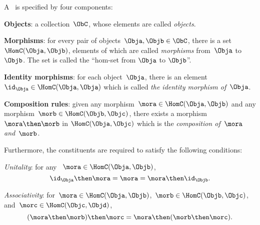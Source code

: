 \begin{ctdefinition}[Category]
    \label{def:categorymain}
    A \emph{}~\CatC is specified by four components:
    \begin{compactenum}
        \item \textbf{Objects}: a collection\footnotemark~$\ObC$, whose elements are called \emph{objects}.
        \item \textbf{Morphisms}: for every pair of objects~$\Obja,\Objb\in \ObC$, there is a set~${ \HomC}({\Obja,\Objb})$, elements of which are called
        \emph{morphisms} from~$\Obja$ to~$ \Objb$. The set is called the ``hom-set from $\Obja$ to $\Objb$''.
        \item \textbf{Identity morphisms}: for each object~$ \Obja$, there is
        an element~$\id_{\Obja} \in \HomC({\Obja,\Obja}) $ which is called \emph{the identity
        morphism of~$\Obja$}.
        \item \textbf{Composition rules}: given any morphism~$ { \mora} \in  \HomC(\Obja,\Objb)$ and any morphism~${ \morb} \in \HomC(\Objb, \Objc)$, there exists a morphism~$\mora \then \morb$ in $\HomC(\Obja,\Objc)$ which is the \emph{composition of~$ \mora$ and~$ \morb$}.
    \end{compactenum}

    Furthermore, the constituents are required to satisfy the following conditions:
    \begin{compactenum}
        \item \emph{Unitality}: for any ~$\mora\in\HomC(\Obja,\Objb)$,
        \begin{equation}
            \id_\Obja \then \mora= \mora = \mora \then \id_\Objb.
        \end{equation}
        \item \emph{Associativity}: for~$\mora\in \HomC(\Obja,\Objb)$,~$\morb\in \HomC(\Objb,\Objc)$, and~$\morc\in \HomC(\Objc,\Objd)$,
        \begin{equation}
        (\mora\then \morb)
            \then \morc= \mora \then (\morb \then \morc).
        \end{equation}
    \end{compactenum}
\end{ctdefinition}



